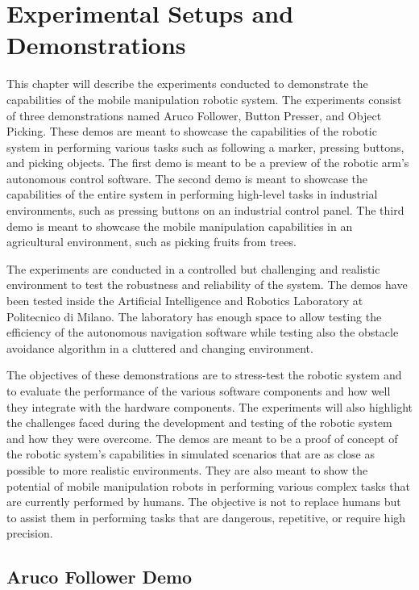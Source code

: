 \chapter{Experimental Setups and Demonstrations}

This chapter will describe the experiments conducted to demonstrate the capabilities of the mobile manipulation
robotic system. The experiments consist of three demonstrations named Aruco Follower, Button Presser, and Object Picking.
These demos are meant to showcase the capabilities of the robotic system in performing various tasks such as following
a marker, pressing buttons, and picking objects. The first demo is meant to be a preview of the robotic arm's
autonomous control software. The second demo is meant to showcase the capabilities of the entire system in performing
high-level tasks in industrial environments, such as pressing buttons on an industrial control panel.
The third demo is meant to showcase the mobile manipulation capabilities in an agricultural environment, such as picking
fruits from trees.

The experiments are conducted in a controlled but challenging and realistic environment to test the robustness
and reliability of the system. The demos have been tested inside the Artificial Intelligence and Robotics Laboratory
at Politecnico di Milano. The laboratory has enough space to allow testing the efficiency of the autonomous 
navigation software while testing also the obstacle avoidance algorithm in a cluttered and changing environment.

The objectives of these demonstrations are to stress-test the robotic system and to evaluate the performance of the
various software components and how well they integrate with the hardware components. The experiments will also
highlight the challenges faced during the development and testing of the robotic system and how they were overcome.
The demos are meant to be a proof of concept of the robotic system's capabilities in simulated scenarios that are as close as
possible to more realistic environments. They are also meant to show the potential of mobile manipulation 
robots in performing various complex tasks that are currently performed by humans. The objective is not to
replace humans but to assist them in performing tasks that are dangerous, repetitive, or require high precision.

\section{Aruco Follower Demo}

